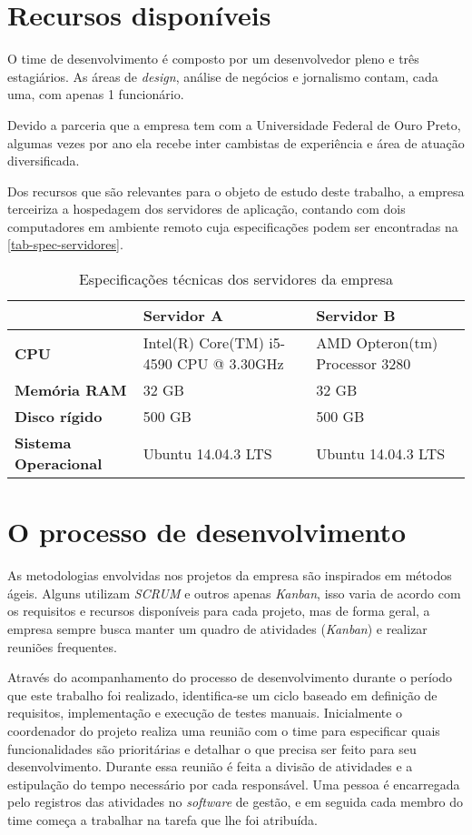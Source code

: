 \documentclass[
	12pt,				%
	openright,			%
	oneside,			%
	a4paper,			%
	english,			%
	french,				%
	spanish,			%
	brazil,				%
	]{abntex2}
\begin{document}
\section{Recursos disponíveis}

O time de desenvolvimento é composto por um desenvolvedor pleno e três estagiários. As áreas de \textit{design}, análise de negócios e jornalismo contam, cada uma, com apenas 1 funcionário.

Devido a parceria que a empresa tem com a Universidade Federal de Ouro Preto, algumas vezes por ano ela recebe inter cambistas de experiência e área de atuação diversificada.

Dos recursos que são relevantes para o objeto de estudo deste trabalho, a empresa terceiriza a hospedagem dos servidores de aplicação, contando com dois computadores em ambiente remoto cuja especificações podem ser encontradas na \autoref{tab-spec-servidores}.

\begin{table}[htb]
	\caption{Especificações técnicas dos servidores da empresa}

	\label{tab-spec-servidores}	
\begin{tabular}{p{3.85cm}|p{5.20cm}|p{5.20cm}}
	 & \textbf{Servidor A} & \textbf{Servidor B}  \\
	\hline
	\textbf{CPU} & Intel(R) Core(TM) i5-4590 CPU @ 3.30GHz & AMD Opteron(tm) Processor 3280 \\
	\hline
	\textbf{Memória RAM} & 32 GB & 32 GB \\
	\hline
	\textbf{Disco rígido} & 500 GB & 500 GB \\
	\hline
	\textbf{Sistema Operacional} & Ubuntu 14.04.3 LTS & Ubuntu 14.04.3 LTS \\
\end{tabular}
\end{table}

\section{O processo de desenvolvimento} 

As metodologias envolvidas nos projetos da empresa são inspirados em métodos ágeis. Alguns utilizam \textit{SCRUM} e outros apenas \textit{Kanban}, isso varia de acordo com os requisitos e recursos disponíveis para cada projeto, mas de forma geral, a empresa sempre busca manter um quadro de atividades (\textit{Kanban}) e realizar reuniões frequentes.

Através do acompanhamento do processo de desenvolvimento durante o período que este trabalho foi realizado, identifica-se um ciclo baseado em definição de requisitos, implementação e execução de testes manuais. Inicialmente o coordenador do projeto realiza uma reunião com o time para especificar quais funcionalidades são prioritárias e detalhar o que precisa ser feito para seu desenvolvimento. Durante essa reunião é feita a divisão de atividades e a estipulação do tempo necessário por cada responsável. Uma pessoa é encarregada pelo registros das atividades no \textit{software} de gestão, e em seguida cada membro do time começa a trabalhar na tarefa que lhe foi atribuída.
\end{document}
